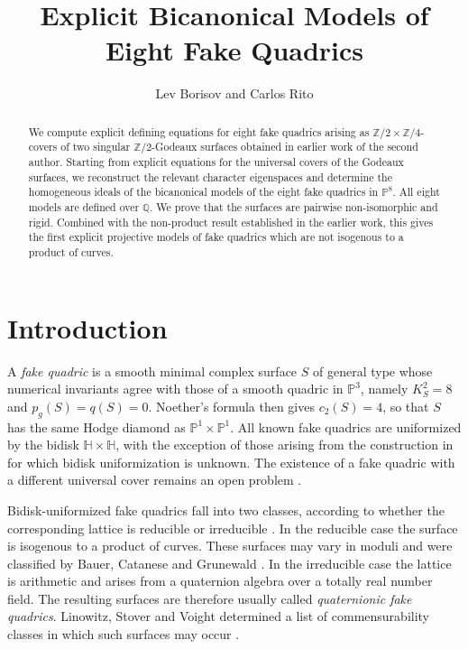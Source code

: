 \documentclass[11pt,a4paper]{article}
\title{Explicit Bicanonical Models of Eight Fake Quadrics}
\author{Lev Borisov and Carlos Rito}
\date{}
\newcommand{\PP}{\mathbb P}
\newcommand{\HH}{\mathbb H}
\begin{document}
\maketitle

\begin{abstract}
We compute explicit defining equations for eight fake quadrics arising as
$\mathbb Z/2\times\mathbb Z/4$-covers of two singular
$\mathbb Z/2$-Godeaux surfaces obtained in earlier work of the second
author. Starting from explicit equations for the universal covers of
the Godeaux surfaces, we reconstruct the relevant character eigenspaces
and determine the homogeneous ideals of the bicanonical models of the
eight fake quadrics in $\mathbb P^8$. All eight models are defined over
$\mathbb Q$. We prove that the surfaces are pairwise non-isomorphic and
rigid. Combined with the non-product result established in the earlier
work, this gives the first explicit projective models of fake quadrics
which are not isogenous to a product of curves.
\end{abstract}

\section{Introduction}\label{sec:introduction}

A \emph{fake quadric} is a smooth minimal complex surface $S$ of general
type whose numerical invariants agree with those of a smooth quadric in $\mathbb P^3$,
namely $K_S^2=8$ and $p_g(S)=q(S)=0$.
Noether's formula then gives $c_2(S)=4$, so that $S$ has the same Hodge diamond as $\PP^1\times\PP^1$.
All known fake quadrics are uniformized by the bidisk $\HH\times\HH$,
with the exception of those arising from the construction in \cite{RitoExplicitFQ}
for which bidisk uniformization is unknown.
The existence of a fake quadric with a different universal cover remains an open problem
\cite[Problem~5]{CasciniCataneseChenKeum25}.

Bidisk-uniformized fake quadrics fall into two classes, according to whether
the corresponding lattice is reducible or irreducible
\cite{DzambicRoulleau14}.  In the reducible case the surface is isogenous to a
product of curves.  These surfaces may vary in moduli and were classified by
Bauer, Catanese and Grunewald \cite{BauerCataneseGrunewald08}.  In the
irreducible case the lattice is arithmetic and arises from a quaternion
algebra over a totally real number field. The resulting surfaces are
therefore usually called \emph{quaternionic fake quadrics}.
Linowitz, Stover and Voight determined a list of commensurability classes in
which such surfaces may occur \cite{LinowitzStoverVoight19}. 
\end{document}

